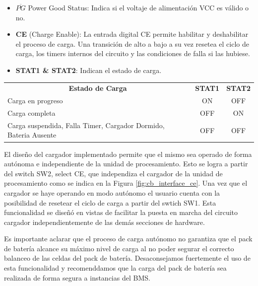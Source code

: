 \documentclass[10pt, a4paper]{report}
\begin{document}
\begin{itemize}
    \item []{\textbf{$\overline{PG}$}} Power Good Status: Indica si el voltaje
	de alimentación VCC es válido o no. 
    \item []{\textbf{CE}} (Charge Enable): La entrada digital CE permite
	habilitar y deshabilitar el proceso de carga. Una transición de alto a
	bajo a su vez resetea el ciclo de carga, los timers internos del
	circuito y las condiciones de falla si las hubiese.
    \item []{\textbf{STAT1 \& STAT2}}: Indican el estado de carga.
\end{itemize}
\begin{table}[h!]
    \begin{tabular}{lcc}
	\multicolumn{1}{c}{\textbf{Estado de Carga}}                     & \textbf{STAT1} & \textbf{STAT2} \\
	Carga en progreso                                                & ON             & OFF            \\
	Carga completa                                                   & OFF            & ON             \\
	Carga suspendida, Falla Timer, Cargador Dormido, Bateria Ausente & OFF            & OFF           
    \end{tabular}
\end{table}
\FloatBarrier

El diseño del cargador implementado permite que el mismo sea operado de forma
autónoma e independiente de la unidad de procesamiento. Esto se logra a partir
del switch SW2, select CE, que independiza el cargador de la unidad de
procesamiento como se indica en la Figura \ref{fig:cb_interface_ce}. Una vez que
el cargador se haye operando en modo autónomo el usuario cuenta con la
posibilidad de resetear el ciclo de carga a partir del swtich SW1. Esta
funcionalidad se diseñó en vistas de facilitar la puesta en marcha del circuito
cargador independientemente de las demás secciones de hardware.

Es importante aclarar que el proceso de carga autónomo no garantiza que el pack
de batería alcance su máximo nivel de carga al no poder segurar el correcto
balanceo de las celdas del pack de batería. Desaconsejamos fuertemente el uso de
esta funcionalidad y recomenddamos que la carga del pack de batería sea
realizada de forma segura a instancias del BMS.
\end{document}
